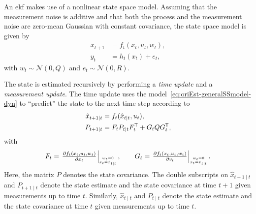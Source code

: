 An \gls{ekf} makes use of a nonlinear state space model. Assuming that the measurement noise is additive and that both the process and the measurement noise are zero-mean Gaussian with constant covariance, the state space model is given by
\begin{subequations}
\begin{align}
x_{t+1} &= f_t(x_t,u_t,w_t), \label{eq:oriEst-generalSSmodel-dyn} \\
y_t &= h_t(x_t) + e_t, \label{eq:oriEst-generalSSmodel-meas}
\end{align}
\label{eq:oriEst-generalSSmodel}%
\end{subequations}%
with $w_t \sim \mathcal{N}(0,Q)$ and $e_t \sim \mathcal{N}(0,R)$.

The state is estimated recursively by performing a \emph{time update} and a \emph{measurement update}. The time update uses the model~\eqref{eq:oriEst-generalSSmodel-dyn} to ``predict'' the state to the next time step according to 
\begin{subequations}
\begin{align}
\hat{x}_{t+1 \mid t} &= f_t(\hat{x}_{t \mid t},u_t), \label{eq:ekfTxupdate} \\
P_{t+1 \mid t} &= F_t P_{t \mid t} F_t^{\mathsf{T}} + G_t Q G_t^{\mathsf{T}}, \label{eq:ekfTPupdate}
\end{align}
\label{eq:oriEst-ekfTimeUpdate}%
\end{subequations}%
with 
\begin{align}
F_t = \givenThat{\tfrac{\partial f_t(x_t,u_t,w_t)}{\partial x_t}}{x_t=\hat{x}_{t \mid t}}{w_t=0}, \qquad G_t = \givenThat{\tfrac{\partial f_t(x_t,u_t,w_t)}{\partial v_t}}{x_t=\hat{x}_{t \mid t}}{w_t=0}.
\label{eq:oriEst-defFG}
\end{align}
Here, the matrix $P$ denotes the state covariance. The double subscripts on $\hat{x}_{t+1 \mid t}$ and $P_{t+1 \mid t}$ denote the state estimate and the state covariance at time $t+1$ given measurements up to time $t$. Similarly, $\hat{x}_{t \mid t}$ and $P_{t \mid t}$ denote the state estimate and the state covariance at time $t$ given measurements up to time $t$. 

